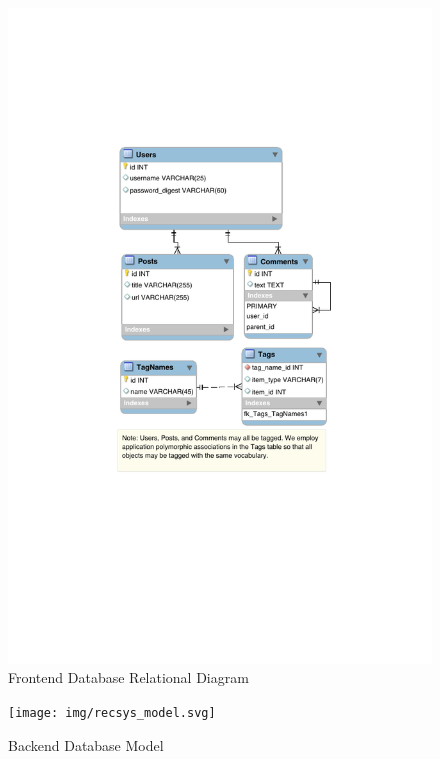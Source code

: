 \documentclass[11pt,letterpaper]{article}
\begin{document}
\begin{figure}
\centering
\includegraphics{img/db_diagram.pdf}
\caption{Frontend Database Relational Diagram}
\label{fig:database}
\end{figure}

\begin{figure}
\centering
\texttt{[image: img/recsys\_model.svg]}
\caption{Backend Database Model}
\label{fig:backend-graph}
\end{figure}

\newpage
\appendix
\end{document}
